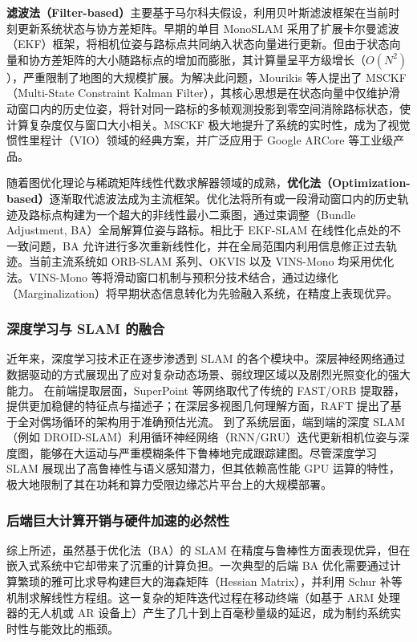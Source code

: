 \textbf{滤波法（Filter-based）}主要基于马尔科夫假设，利用贝叶斯滤波框架在当前时刻更新系统状态与协方差矩阵。早期的单目 MonoSLAM\cite{davison2007monoslam} 采用了扩展卡尔曼滤波（EKF）框架，将相机位姿与路标点共同纳入状态向量进行更新。但由于状态向量和协方差矩阵的大小随路标点的增加而膨胀，其计算量呈平方级增长（$O(N^2)$），严重限制了地图的大规模扩展。为解决此问题，Mourikis 等人提出了 MSCKF（Multi-State Constraint Kalman Filter）\cite{mourikis2007multi}，其核心思想是在状态向量中仅维护滑动窗口内的历史位姿，将针对同一路标的多帧观测投影到零空间消除路标状态，使计算复杂度仅与窗口大小相关。MSCKF 极大地提升了系统的实时性，成为了视觉惯性里程计（VIO）领域的经典方案，并广泛应用于 Google ARCore 等工业级产品。

随着图优化理论与稀疏矩阵线性代数求解器领域的成熟，\textbf{优化法（Optimization-based）}逐渐取代滤波法成为主流框架。优化法将所有或一段滑动窗口内的历史轨迹及路标点构建为一个超大的非线性最小二乘图，通过束调整（Bundle Adjustment, BA）全局解算位姿与路标。相比于 EKF-SLAM 在线性化点处的不一致问题，BA 允许进行多次重新线性化，并在全局范围内利用信息修正过去轨迹。当前主流系统如 ORB-SLAM 系列、OKVIS\cite{leutenegger2015keyframe} 以及 VINS-Mono\cite{qin2018vins} 均采用优化法。VINS-Mono 等将滑动窗口机制与预积分技术结合，通过边缘化（Marginalization）将早期状态信息转化为先验融入系统，在精度上表现优异。

\subsubsection{深度学习与 SLAM 的融合}
近年来，深度学习技术正在逐步渗透到 SLAM 的各个模块中。深层神经网络通过数据驱动的方式展现出了应对复杂动态场景、弱纹理区域以及剧烈光照变化的强大能力。
在前端提取层面，SuperPoint 等网络取代了传统的 FAST/ORB 提取器，提供更加稳健的特征点与描述子；在深层多视图几何理解方面，RAFT\cite{teed2020raft} 提出了基于全对偶场循环的架构用于准确预估光流。
到了系统层面，端到端的深度 SLAM（例如 DROID-SLAM\cite{zhu2020droid}）利用循环神经网络（RNN/GRU）迭代更新相机位姿与深度图，能够在大运动与严重模糊条件下鲁棒地完成跟踪建图。尽管深度学习 SLAM 展现出了高鲁棒性与语义感知潜力，但其依赖高性能 GPU 运算的特性，极大地限制了其在功耗和算力受限边缘芯片平台上的大规模部署。

\subsubsection{后端巨大计算开销与硬件加速的必然性}
综上所述，虽然基于优化法（BA）的 SLAM 在精度与鲁棒性方面表现优异，但在嵌入式系统中它却带来了沉重的计算负担。一次典型的后端 BA 优化需要通过计算繁琐的雅可比求导构建巨大的海森矩阵（Hessian Matrix），并利用 Schur 补等机制求解线性方程组。这一复杂的矩阵迭代过程在移动终端（如基于 ARM 处理器的无人机或 AR 设备上）产生了几十到上百毫秒量级的延迟，成为制约系统实时性与能效比的瓶颈。

